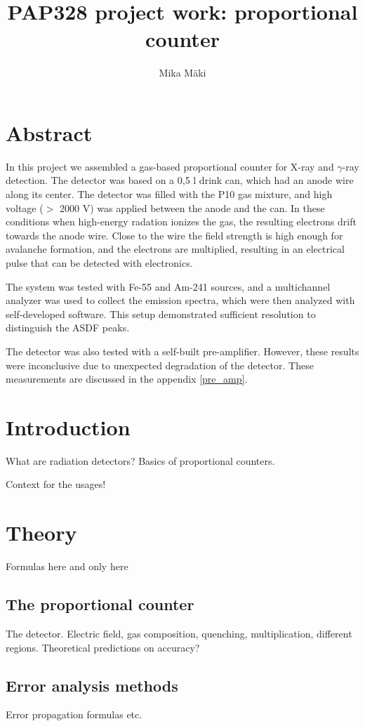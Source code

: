 \documentclass[a4paper]{article}
\title{PAP328 project work: proportional counter}
\author{Mika Mäki}
\begin{document}
\maketitle

\section*{Abstract}
In this project we assembled a gas-based proportional counter for X-ray and $\gamma$-ray detection.
The detector was based on a 0,5 l drink can, which had an anode wire along its center.
The detector was filled with the P10 gas mixture, and high voltage ($>$ 2000 V) was applied between the anode and the can.
In these conditions when high-energy radation ionizes the gas, the resulting electrons drift towards the anode wire.
Close to the wire the field strength is high enough for avalanche formation, and the electrons are multiplied, resulting in an electrical pulse that can be detected with electronics.

The system was tested with Fe-55 and Am-241 sources, and a multichannel analyzer was used to collect the emission spectra, which were then analyzed with self-developed software.
This setup demonstrated sufficient resolution to distinguish the ASDF peaks.

The detector was also tested with a self-built pre-amplifier.
However, these results were inconclusive due to unexpected degradation of the detector.
These measurements are discussed in the appendix \ref{pre_amp}.


\section{Introduction}
What are radiation detectors?
Basics of proportional counters.

Context for the usages!


\section{Theory}
Formulas here and only here

\subsection{The proportional counter}
The detector.
Electric field, gas composition, quenching, multiplication, different regions.
Theoretical predictions on accuracy?

\subsection{Error analysis methods}
Error propagation formulas etc.
\end{document}
